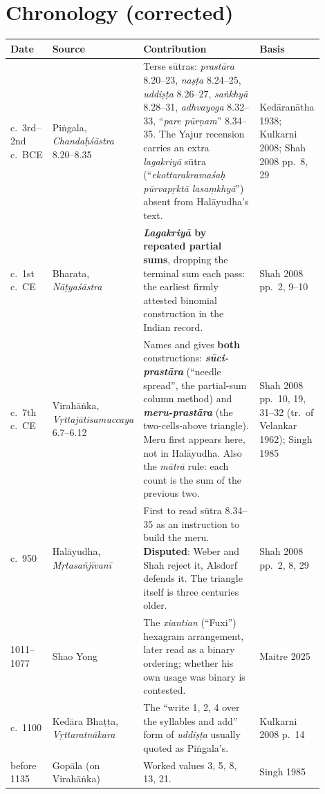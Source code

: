 \documentclass[11pt,letterpaper]{article}
\newcommand{\skt}[1]{\textit{#1}}
\theoremstyle{plain}
\theoremstyle{remark}
\begin{document}
\section{Chronology (corrected)}\label{sec:chron}

{\small
\begin{longtable}{@{}p{0.12\linewidth}p{0.21\linewidth}p{0.40\linewidth}p{0.17\linewidth}@{}}
\toprule
\textbf{Date} & \textbf{Source} & \textbf{Contribution} & \textbf{Basis}\\
\midrule\endhead
\bottomrule\endfoot
c.\ 3rd--2nd c.\ BCE & Piṅgala, \skt{Chandaḥśāstra} 8.20--8.35 & Terse sūtras: \skt{prastāra} 8.20--23, \skt{naṣṭa} 8.24--25, \skt{uddiṣṭa} 8.26--27, \skt{saṅkhyā} 8.28--31, \skt{adhvayoga} 8.32--33, ``\skt{pare pūrṇam}'' 8.34--35. The Yajur recension carries an extra \skt{lagakriyā} sūtra (``\skt{ekottarakramaśaḥ pūrvapṛktā lasaṃkhyā}'') absent from Halāyudha's text. & Kedāranātha 1938; Kulkarni 2008; Shah 2008 pp.\ 8, 29\\
c.\ 1st c.\ CE & Bharata, \skt{Nāṭyaśāstra} & \textbf{\skt{Lagakriyā} by repeated partial sums}, dropping the terminal sum each pass: the earliest firmly attested binomial construction in the Indian record. & Shah 2008 pp.\ 2, 9--10\\
c.\ 7th c.\ CE & Virahāṅka, \skt{Vṛttajātisamuccaya} 6.7--6.12 & Names and gives \textbf{both} constructions: \textbf{\skt{sūci-prastāra}} (``needle spread'', the partial-sum column method) and \textbf{\skt{meru-prastāra}} (the two-cells-above triangle). Meru first appears here, not in Halāyudha. Also the \skt{mātrā} rule: each count is the sum of the previous two. & Shah 2008 pp.\ 10, 19, 31--32 (tr.\ of Velankar 1962); Singh 1985\\
c.\ 950 & Halāyudha, \skt{Mṛtasañjīvanī} & First to read sūtra 8.34--35 as an instruction to build the meru. \textbf{Disputed}: Weber and Shah reject it, Alsdorf defends it. The triangle itself is three centuries older. & Shah 2008 pp.\ 2, 8, 29\\
1011--1077 & Shao Yong & The \skt{xiantian} (``Fuxi'') hexagram arrangement, later read as a binary ordering; whether his own usage was binary is contested. & Maitre 2025\\
c.\ 1100 & Kedāra Bhaṭṭa, \skt{Vṛttaratnākara} & The ``write 1, 2, 4 over the syllables and add'' form of \skt{uddiṣṭa} usually quoted as Piṅgala's. & Kulkarni 2008 p.\ 14\\
before 1135 & Gopāla (on Virahāṅka) & Worked values 3, 5, 8, 13, 21. & Singh 1985\\

\end{longtable}}
\end{document}
